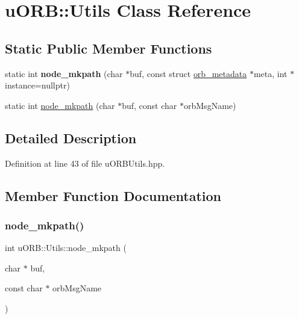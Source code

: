 \hypertarget{classuORB_1_1Utils}{}\section{u\+O\+RB\+:\+:Utils Class Reference}
\label{classuORB_1_1Utils}
\subsection*{Static Public Member Functions}
\begin{DoxyCompactItemize}
\item 
\mbox{\label{classuORB_1_1Utils_a83fea5453fe535f1b39fd7b7a1c858aa}} 
static int {\bfseries node\+\_\+mkpath} (char $\ast$buf, const struct \hyperlink{structorb__metadata}{orb\+\_\+metadata} $\ast$meta, int $\ast$instance=nullptr)
\item 
static int \hyperlink{classuORB_1_1Utils_ae4fd067a58c093bc4d0b461f89e9368c}{node\+\_\+mkpath} (char $\ast$buf, const char $\ast$orb\+Msg\+Name)
\end{DoxyCompactItemize}


\subsection{Detailed Description}


Definition at line 43 of file u\+O\+R\+B\+Utils.\+hpp.



\subsection{Member Function Documentation}
\mbox{\label{classuORB_1_1Utils_ae4fd067a58c093bc4d0b461f89e9368c}} 
\subsubsection{\texorpdfstring{node\+\_\+mkpath()}{node\_mkpath()}}
{\footnotesize\ttfamily int u\+O\+R\+B\+::\+Utils\+::node\+\_\+mkpath (\begin{DoxyParamCaption}\item[{char $\ast$}]{buf,  }\item[{const char $\ast$}]{orb\+Msg\+Name }\end{DoxyParamCaption})\hspace{0.3cm}{\ttfamily [static]}}

